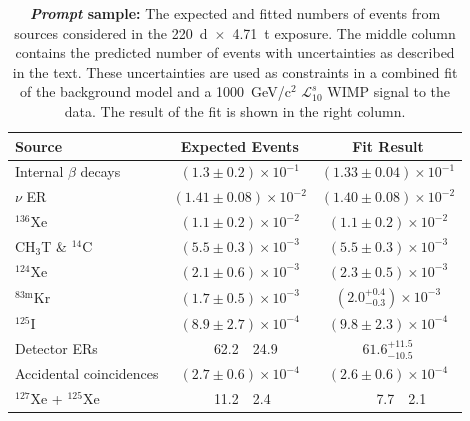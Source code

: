 
\setlength{\tabcolsep}{12pt} %
\begin{table}[ht]
    \centering
    \caption{\textbf{\emph{Prompt} sample:}
    The expected and fitted numbers of events from sources considered in the 220~d~$\times$~4.71~t exposure.
    The middle column contains the predicted number of events with uncertainties as described in the text.
    These uncertainties are used as constraints in a combined fit of the background model and a 1000~GeV/c$^2$ $\mathcal{L}^{s}_{10}$ WIMP signal to the data.
    The result of the fit is shown in the right column.}
    \begin{tabular}{l
            r@{$\,\pm\,$}l
            r@{$\,\pm\,$}l}
     \hline 
     \hline 
     Source & \multicolumn{2}{c}{Expected Events} & \multicolumn{2}{c}{Fit Result} \\ \hline
     Internal $\beta$ decays          & \multicolumn{2}{c}{$(1.3 \pm 0.2) \times 10^{-1}$} & \multicolumn{2}{c}{$(1.33 \pm 0.04) \times 10^{-1}$} \\
     $\nu$ ER                         & \multicolumn{2}{c}{$(1.41 \pm 0.08) \times 10^{-2}$} & \multicolumn{2}{c}{$(1.40 \pm 0.08) \times 10^{-2}$} \\
     $^{136}$Xe                       & \multicolumn{2}{c}{$(1.1 \pm 0.2) \times 10^{-2}$}  & \multicolumn{2}{c}{$(1.1 \pm 0.2) \times 10^{-2}$} \\
     CH$_3$T \& $^{14}$C              & \multicolumn{2}{c}{$(5.5 \pm 0.3) \times 10^{-3}$}     & \multicolumn{2}{c}{$(5.5 \pm 0.3) \times 10^{-3}$} \\
     $^{124}$Xe                      & \multicolumn{2}{c}{$(2.1 \pm 0.6) \times 10^{-3}$} & \multicolumn{2}{c}{$(2.3 \pm 0.5) \times 10^{-3}$} \\
     $^{83\mathrm{m}}$Kr             & \multicolumn{2}{c}{$(1.7 \pm 0.5) \times 10^{-3}$} & \multicolumn{2}{c}{$\left(2.0^{+0.4}_{-0.3}\right) \times 10^{-3}$} \\
     $^{125}$I                       & \multicolumn{2}{c}{$(8.9 \pm 2.7) \times 10^{-4}$} & \multicolumn{2}{c}{$(9.8 \pm 2.3) \times 10^{-4}$} \\
     Detector ERs                    & $\,\,\,$62.2     & 24.9   & \multicolumn{2}{c}{$61.6^{+11.5}_{-10.5}$}$\,\,\,\,\,\,$ \\
     Accidental coincidences         & \multicolumn{2}{c}{$(2.7 \pm 0.6) \times 10^{-4}$} & \multicolumn{2}{c}{$(2.6 \pm 0.6) \times 10^{-4}$} \\
     $^{127}$Xe + $^{125}$Xe         & 11.2     & 2.4    & $\,\,\,\,\,\,$7.7 & 2.1 \\

\end{tabular}
\end{table}
